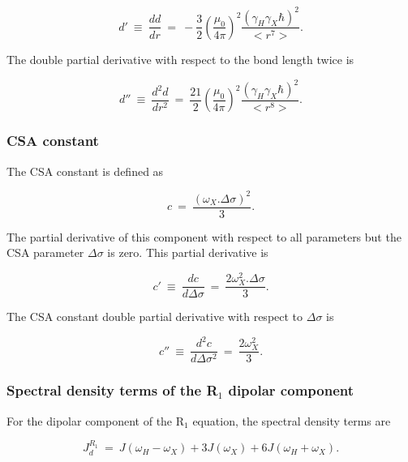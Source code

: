 \begin{equation}
    d' \ \equiv \ \frac{d d}{d r} \ = \ - \frac{3}{2} \left(\frac{\mu_0}{4\pi}\right)^2 \frac{\left( \gamma_H \gamma_X \hbar \right)^2}{<r^7>}. \label{eq: Ri': d'}
\end{equation}

\noindent The double partial derivative with respect to the bond length twice is

\begin{equation}
    d'' \ \equiv \ \frac{d^2 d}{d r^2} \ = \ \frac{21}{2} \left(\frac{\mu_0}{4\pi}\right)^2 \frac{\left( \gamma_H \gamma_X \hbar \right)^2}{<r^8>}. \label{eq: Ri': d"}
\end{equation}


\subsubsection{CSA constant}

The CSA constant is defined as

\begin{equation}
    c \ = \ \frac{\left(\omega_X . \Delta\sigma \right)^2}{3}. \label{eq: Ri': c}
\end{equation}

\noindent The partial derivative of this component with respect to all parameters but the CSA parameter $\Delta\sigma$ is zero.  This partial derivative is

\begin{equation}
    c' \ \equiv \ \frac{d c}{d \Delta\sigma} \ = \ \frac{2 \omega_X^2 . \Delta\sigma}{3}. \label{eq: Ri': c'}
\end{equation}

\noindent The CSA constant double partial derivative with respect to $\Delta\sigma$ is

\begin{equation}
    c'' \ \equiv \ \frac{d^2 c}{d \Delta\sigma^2} \ = \ \frac{2 \omega_X^2}{3}. \label{eq: Ri': c"}
\end{equation}


\subsubsection{Spectral density terms of the R$_1$ dipolar component}

For the dipolar component of the R$_1$ equation, the spectral density terms are

\begin{equation}
    J_d^{R_1} \ = \ J(\omega_H - \omega_X) + 3J(\omega_X) + 6J(\omega_H + \omega_X).  \label{eq: J terms: JR1d}
\end{equation}

